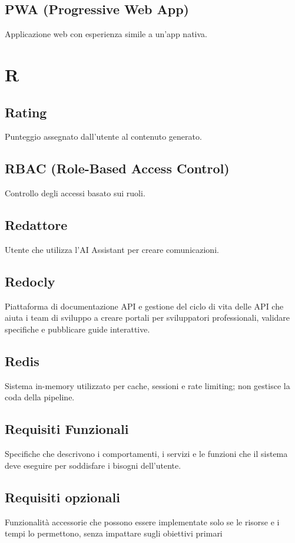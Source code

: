 \documentclass[a4paper,12pt]{article}
\begin{document}
\subsection{PWA (Progressive Web App)}
Applicazione web con esperienza simile a un'app nativa.

\section{R}
\subsection{Rating}
Punteggio assegnato dall'utente al contenuto generato.

\subsection{RBAC (Role-Based Access Control)}
Controllo degli accessi basato sui ruoli.

\subsection{Redattore}
Utente che utilizza l'AI Assistant per creare comunicazioni.

\subsection{Redocly}
Piattaforma di documentazione API e gestione del ciclo di vita delle API che aiuta i team di sviluppo a creare portali per sviluppatori professionali, validare specifiche e pubblicare guide interattive.

\subsection{Redis}
Sistema in-memory utilizzato per cache, sessioni e rate limiting; non gestisce la coda della pipeline.

\subsection{Requisiti Funzionali}
Specifiche che descrivono i comportamenti, i servizi e le funzioni che il sistema deve eseguire per soddisfare i bisogni dell'utente.

\subsection{Requisiti opzionali}
Funzionalità accessorie che possono essere implementate solo se le risorse e i tempi lo permettono, senza impattare sugli obiettivi primari
\end{document}
